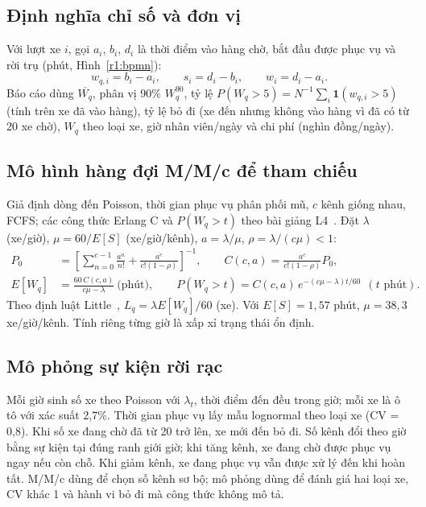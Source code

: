 \subsection{Định nghĩa chỉ số và đơn vị}
Với lượt xe $i$, gọi $a_i$, $b_i$, $d_i$ là thời điểm vào hàng chờ, bắt đầu
được phục vụ và rời trụ (phút, Hình~\ref{r1:bpmn}):
\begin{equation}
 w_{q,i}=b_i-a_i,\qquad s_i=d_i-b_i,\qquad w_i=d_i-a_i.
\end{equation}
Báo cáo dùng $\overline{W_q}$, phân vị 90\% $W_q^{90}$, tỷ lệ
$P(W_q{>}5)=N^{-1}\sum_i\mathbf 1(w_{q,i}>5)$ (tính trên xe đã vào hàng), tỷ
lệ bỏ đi (xe đến nhưng không vào hàng vì đã có từ 20 xe chờ), $W_q$ theo loại
xe, giờ nhân viên/ngày và chi phí (nghìn đồng/ngày).

\subsection{Mô hình hàng đợi M/M/c để tham chiếu}
Giả định dòng đến Poisson, thời gian phục vụ phân phối mũ, $c$ kênh giống nhau,
FCFS; các công thức Erlang C và $P(W_q>t)$ theo bài giảng L4~\cite[tr.~46--47, 52]{l4}.
Đặt $\lambda$ (xe/giờ), $\mu=60/E[S]$ (xe/giờ/kênh), $a=\lambda/\mu$,
$\rho=\lambda/(c\mu)<1$:
\begin{align}
 P_0&=\left[\sum_{n=0}^{c-1}\frac{a^n}{n!}+\frac{a^c}{c!(1-\rho)}\right]^{-1},\qquad
 C(c,a)=\frac{a^c}{c!(1-\rho)}P_0,\\
 E[W_q]&=\frac{60\,C(c,a)}{c\mu-\lambda}\ \text{(phút)},\qquad
 P(W_q>t)=C(c,a)\,e^{-(c\mu-\lambda)t/60}\ \ (t\text{ phút}).
\end{align}
Theo định luật Little~\cite[tr.~21--22]{l4}, $L_q=\lambda E[W_q]/60$ (xe).
Với $E[S]=1{,}57$ phút, $\mu=38{,}3$ xe/giờ/kênh. Tính riêng từng giờ là xấp xỉ
trạng thái ổn định.

\subsection{Mô phỏng sự kiện rời rạc}
Mỗi giờ sinh số xe theo Poisson với $\lambda_t$, thời điểm đến đều trong giờ;
mỗi xe là ô tô với xác suất 2,7\%. Thời gian phục vụ lấy mẫu lognormal theo
loại xe (CV = 0,8). Khi số xe đang chờ đã từ 20 trở lên, xe mới đến bỏ đi.
Số kênh đổi theo giờ bằng sự kiện tại đúng ranh giới giờ; khi tăng kênh, xe
đang chờ được phục vụ ngay nếu còn chỗ. Khi giảm kênh, xe đang phục vụ vẫn
được xử lý đến khi hoàn tất.
M/M/c dùng để chọn số kênh sơ bộ; mô phỏng dùng để đánh giá hai loại xe, CV
khác 1 và hành vi bỏ đi mà công thức không mô tả.

